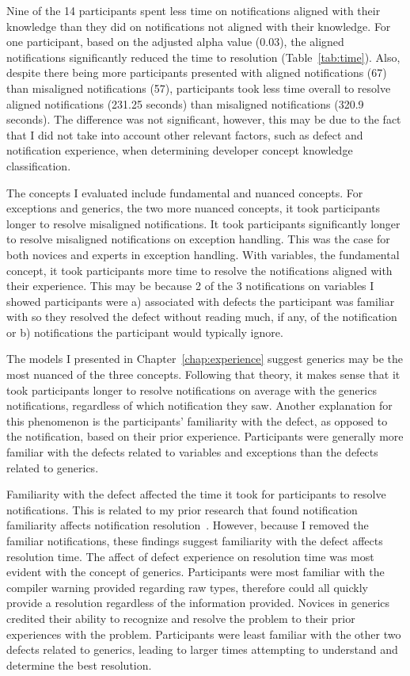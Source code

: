 Nine of the 14 participants spent less time on notifications aligned with their knowledge than they did on notifications not aligned with their knowledge.
For one participant, based on the adjusted alpha value (0.03), the aligned notifications significantly reduced the time to resolution (Table~\ref{tab:time}).
Also, despite there being more participants presented with aligned notifications (67) than misaligned notifications (57), participants took less time overall to resolve aligned notifications (231.25 seconds) than misaligned notifications (320.9 seconds). The difference was not significant, however, this may be due to the fact that I did not take into account other relevant factors, such as defect and notification experience, when determining developer concept knowledge classification.

The concepts I evaluated include fundamental and nuanced concepts.
For exceptions and generics, the two more nuanced concepts, it took participants longer to resolve misaligned notifications.
It took participants significantly longer to resolve misaligned notifications on exception handling. 
This was the case for both novices and experts in exception handling.
With variables, the fundamental concept, it took participants more time to resolve the notifications aligned with their experience. 
This may be because 2 of the 3 notifications on variables I showed participants were a) associated with defects the participant was familiar with so they resolved the defect without reading much, if any, of the notification or b) notifications the participant would typically ignore.

The models I presented in Chapter~\ref{chap:experience} suggest generics may be the most nuanced of the three concepts. Following that theory, it makes sense that it took participants longer to resolve notifications on average with the generics notifications, regardless of which notification they saw.
Another explanation for this phenomenon is the participants' familiarity with the defect, as opposed to the notification, based on their prior experience.
Participants were generally more familiar with the defects related to variables and exceptions than the defects related to generics.

Familiarity with the defect affected the time it took for participants to resolve notifications.
This is related to my prior research that found notification familiarity affects notification resolution~\cite{johnson2016cross}. However, because I removed the familiar notifications, these findings suggest familiarity with the defect affects resolution time.
The affect of defect experience on resolution time was most evident with the concept of generics. Participants were most familiar with the compiler warning provided regarding raw types, therefore could all quickly provide a resolution regardless of the information provided.
Novices in generics credited their ability to recognize and resolve the problem to their prior experiences with the problem.
Participants were least familiar with the other two defects related to generics, leading to larger times attempting to understand and determine the best resolution. 


